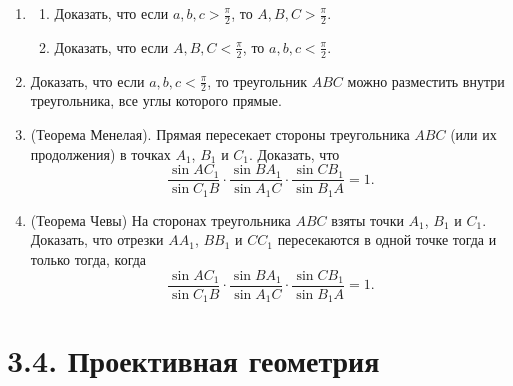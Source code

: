 \begin{enumerate}
		\item
		\begin{enumerate}
			\item Доказать, что если $a, b, c > \frac{\pi}{2}$, то $A, B, C > \frac{\pi}{2}$.
			\item Доказать, что если $A, B, C < \frac{\pi}{2}$, то $a, b, c < \frac{\pi}{2}$.
		\end{enumerate}
 
		\item Доказать, что если $a, b, c < \frac{\pi}{2}$, то треугольник $ABC$ можно разместить внутри треугольника, все углы которого прямые.
 
		\item (Теорема Менелая). Прямая пересекает стороны треугольника $ABC$ (или их продолжения) в точках $A_1$, $B_1$ и $C_1$. Доказать, что
		\[
			\frac{\sin AC_1}{\sin C_1 B} \cdot \frac{\sin BA_1}{\sin A_1 C} \cdot \frac{\sin CB_1}{\sin B_1 A} = 1.
		\]
 
		\item (Теорема Чевы) На сторонах треугольника $ABC$ взяты точки $A_1$, $B_1$ и $C_1$. Доказать, что отрезки $AA_1$, $BB_1$ и $CC_1$ пересекаются в одной точке тогда и только тогда, когда
		\[
			\frac{\sin AC_1}{\sin C_1 B} \cdot \frac{\sin BA_1}{\sin A_1 C} \cdot \frac{\sin CB_1}{\sin B_1 A} = 1.
		\]
	\end{enumerate}
 
	\section{3.4. Проективная геометрия}
 
